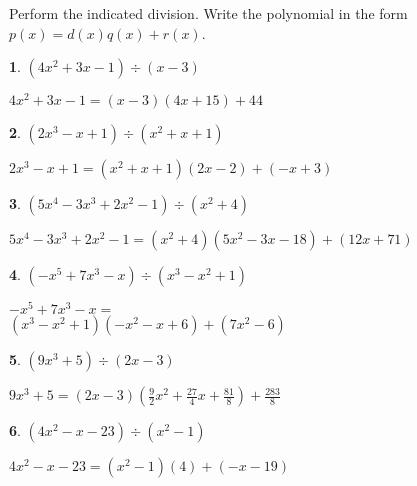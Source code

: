 \documentclass{amsbook}
\newtheorem{exc}{}
\newenvironment{ex}{\begin{exc}\normalfont}{\end{exc}}
\numberwithin{section}{chapter}
\numberwithin{equation}{chapter}
\begin{document}
Perform the indicated division.  Write the polynomial in the form $p(x) = d(x)q(x) + r(x)$.

\begin{multicols}{2}
	
	\begin{ex}
		$\left(4x^2+3x-1 \right) \div (x-3)$ 
		\begin{sol}
			 $4x^2+3x-1 = (x-3)(4x+15) + 44$
		\end{sol}
	\end{ex}
	
\begin{ex}
	$\left(2x^3-x+1 \right) \div \left(x^{2} +x+1 \right)$ 
	\begin{sol}
		$2x^3-x+1 = \left(x^2+x+1\right)(2x-2)+(-x+3)$
	\end{sol}
\end{ex}
	
\begin{ex}
	$\left(5x^{4} - 3x^{3} + 2x^{2} - 1 \right) \div \left(x^{2} + 4 \right)$
	\begin{sol}
		$5x^{4} - 3x^{3} + 2x^{2} - 1 = \left(x^{2} + 4 \right) \left(5x^{2} - 3x - 18 \right) + (12x + 71)$
	\end{sol}
\end{ex}
	
\begin{ex}
	$\left(-x^{5} + 7x^{3} - x \right) \div \left(x^{3} - x^{2} + 1 \right)$
	
	\begin{sol}
	$-x^{5} + 7x^{3} - x =$\\ $\left(x^{3} - x^{2} + 1 \right) \left(-x^{2} - x + 6 \right) + \left(7x^{2} - 6 \right)$	
	\end{sol}
\end{ex}
	
\begin{ex}
	$\left(9x^{3} + 5 \right) \div \left(2x - 3 \right)$
	\begin{sol}
		$9x^{3} + 5 =(2x - 3) \left(\frac{9}{2}x^{2} + \frac{27}{4}x + \frac{81}{8} \right) + \frac{283}{8}$
	\end{sol}
\end{ex}
	
\begin{ex}
	$\left(4x^2 - x - 23 \right) \div \left(x^{2} - 1 \right)$
	\begin{sol}
		$4x^2 - x - 23 = \left(x^{2} - 1 \right)(4) + (-x - 19)$
	\end{sol}
\end{ex}


\end{multicols}
\end{document}
